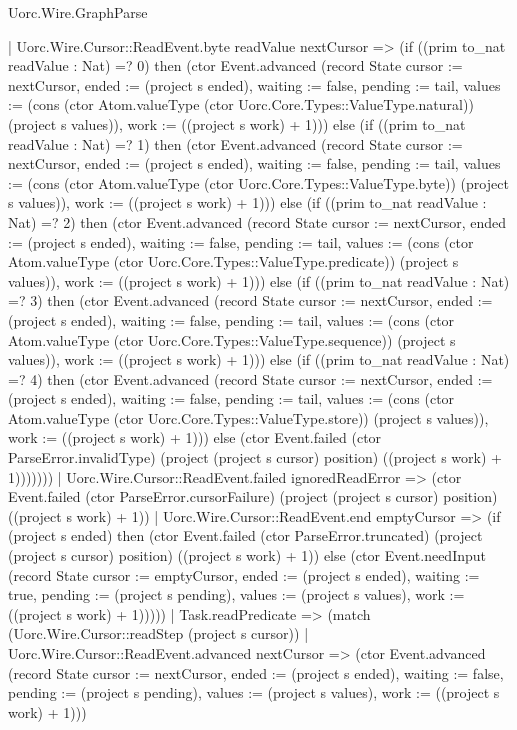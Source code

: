 \begin{lexlean}{Uorc.Wire.GraphParse}
\begin{semanticmodule}
{        | Uorc.Wire.Cursor::ReadEvent.byte readValue nextCursor => (if ((prim to_nat readValue : Nat) =? 0) then (ctor Event.advanced (record State {cursor := nextCursor, ended := (project s ended), waiting := false, pending := tail, values := (cons (ctor Atom.valueType (ctor Uorc.Core.Types::ValueType.natural)) (project s values)), work := ((project s work) + 1)})) else (if ((prim to_nat readValue : Nat) =? 1) then (ctor Event.advanced (record State {cursor := nextCursor, ended := (project s ended), waiting := false, pending := tail, values := (cons (ctor Atom.valueType (ctor Uorc.Core.Types::ValueType.byte)) (project s values)), work := ((project s work) + 1)})) else (if ((prim to_nat readValue : Nat) =? 2) then (ctor Event.advanced (record State {cursor := nextCursor, ended := (project s ended), waiting := false, pending := tail, values := (cons (ctor Atom.valueType (ctor Uorc.Core.Types::ValueType.predicate)) (project s values)), work := ((project s work) + 1)})) else (if ((prim to_nat readValue : Nat) =? 3) then (ctor Event.advanced (record State {cursor := nextCursor, ended := (project s ended), waiting := false, pending := tail, values := (cons (ctor Atom.valueType (ctor Uorc.Core.Types::ValueType.sequence)) (project s values)), work := ((project s work) + 1)})) else (if ((prim to_nat readValue : Nat) =? 4) then (ctor Event.advanced (record State {cursor := nextCursor, ended := (project s ended), waiting := false, pending := tail, values := (cons (ctor Atom.valueType (ctor Uorc.Core.Types::ValueType.store)) (project s values)), work := ((project s work) + 1)})) else (ctor Event.failed (ctor ParseError.invalidType) (project (project s cursor) position) ((project s work) + 1)))))))
        | Uorc.Wire.Cursor::ReadEvent.failed ignoredReadError => (ctor Event.failed (ctor ParseError.cursorFailure) (project (project s cursor) position) ((project s work) + 1))
        | Uorc.Wire.Cursor::ReadEvent.end emptyCursor => (if (project s ended) then (ctor Event.failed (ctor ParseError.truncated) (project (project s cursor) position) ((project s work) + 1)) else (ctor Event.needInput (record State {cursor := emptyCursor, ended := (project s ended), waiting := true, pending := (project s pending), values := (project s values), work := ((project s work) + 1)}))))
      | Task.readPredicate => (match (Uorc.Wire.Cursor::readStep (project s cursor))
        | Uorc.Wire.Cursor::ReadEvent.advanced nextCursor => (ctor Event.advanced (record State {cursor := nextCursor, ended := (project s ended), waiting := false, pending := (project s pending), values := (project s values), work := ((project s work) + 1)}))
}
\end{semanticmodule}
\end{lexlean}

